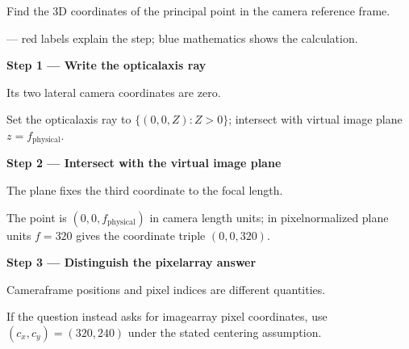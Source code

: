 \documentclass[letterpaper,11pt,english,openany,oneside]{jupyterBook}
\begin{document}
\sphinxAtStartPar
Find the 3D coordinates of the principal point in the camera reference frame.

\par\medskip

\sphinxAtStartPar
{} — red labels explain the step; blue mathematics shows the calculation.

\par\medskip{}
{\color{QuizStepRed}\bfseries Step 1 — Write the optical\sphinxhyphen{}axis ray}\par\smallskip

\sphinxAtStartPar
{} Its two lateral camera coordinates are zero.

\sphinxAtStartPar
Set the optical\sphinxhyphen{}axis ray to {\color{QuizMathBlue} \(\{(0,0,Z):Z>0\}\)}; intersect with virtual image plane {\color{QuizMathBlue} \(z=f_{\mathrm{physical}}\)}.

\par

\par\medskip{}
{\color{QuizStepRed}\bfseries Step 2 — Intersect with the virtual image plane}\par\smallskip

\sphinxAtStartPar
{} The plane fixes the third coordinate to the focal length.

\sphinxAtStartPar
The point is {\color{QuizMathBlue} \(\boxed{(0,0,f_{\mathrm{physical}})}\)} in camera length units; in pixel\sphinxhyphen{}normalized plane units {\color{QuizMathBlue} \(f=320\)} gives the coordinate triple {\color{QuizMathBlue} \((0,0,320)\)}.

\par

\par\medskip{}
{\color{QuizStepRed}\bfseries Step 3 — Distinguish the pixel\sphinxhyphen{}array answer}\par\smallskip

\sphinxAtStartPar
{} Camera\sphinxhyphen{}frame positions and pixel indices are different quantities.

\sphinxAtStartPar
If the question instead asks for image\sphinxhyphen{}array pixel coordinates, use {\color{QuizMathBlue} \((c_x,c_y)=(320,240)\)} under the stated centering assumption.

\par
\end{document}

